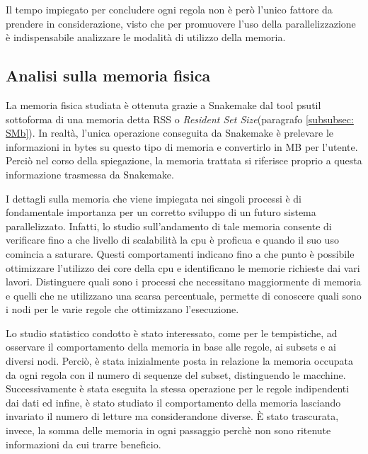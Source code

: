 Il tempo impiegato per concludere ogni regola non è però l'unico fattore da prendere in considerazione, visto che per promuovere l'uso della parallelizzazione è indispensabile analizzare le modalità di utilizzo della memoria. 

\subsection{Analisi sulla memoria fisica}
\label{subsec:Mf}
La memoria fisica studiata è ottenuta grazie a Snakemake dal tool psutil sottoforma di una memoria detta RSS o \textit{Resident Set Size}(paragrafo \ref{subsubsec: SMb}). 
In realtà, l'unica operazione conseguita da Snakemake è prelevare le informazioni in bytes su questo tipo di memoria e convertirlo in MB per l'utente.
Perciò nel corso della spiegazione, la memoria trattata si riferisce proprio a questa informazione trasmessa da Snakemake.  

I dettagli sulla memoria che viene impiegata nei singoli processi è di fondamentale importanza per un corretto sviluppo di un futuro sistema parallelizzato.
Infatti, lo studio sull'andamento di tale memoria consente di verificare fino a che livello di scalabilità la cpu è proficua e quando il suo uso comincia a saturare.
Questi comportamenti indicano fino a che punto è possibile ottimizzare l'utilizzo dei core della cpu e identificano le memorie richieste dai vari lavori.
Distinguere quali sono i processi che necessitano maggiormente di memoria e quelli che ne utilizzano una scarsa percentuale, permette di conoscere quali sono i nodi per le varie regole che ottimizzano l'esecuzione.

Lo studio statistico condotto è stato interessato, come per le tempistiche, ad osservare il comportamento della memoria in base alle regole, ai subsets e ai diversi nodi.
Perciò, è stata inizialmente posta in relazione la memoria occupata da ogni regola con il numero di sequenze del subset, distinguendo le macchine.
Successivamente è stata eseguita la stessa operazione per le regole indipendenti dai dati ed infine, è stato studiato il comportamento della memoria lasciando invariato il numero di letture ma considerandone diverse.
È stato trascurata, invece, la somma delle memoria in ogni passaggio perchè non sono ritenute informazioni da cui trarre beneficio. 
    


